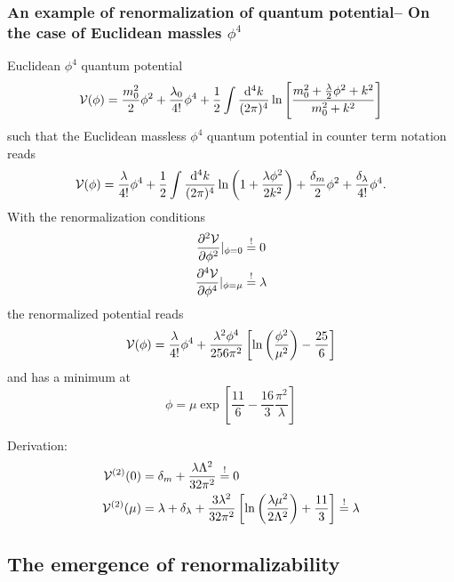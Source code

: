 \subsubsection{An example of renormalization of quantum potential-- On the case of Euclidean massles $\phi^4$}
\begin{mybox}{}
	Euclidean $\phi^4$ quantum potential
	\begin{equation}
		\mathcal{V}(\phi)=\frac{m^2_0}{2} \phi^2 +\frac{\lambda_0}{4!} \phi^4 + \frac{1}{2} \int \frac{\mathrm{d}^4 k}{(2 \pi)^4} \ln \left[\frac{m^2_0+\frac{\lambda}{2} \phi^2+k^2}{m^2_0+k^2}\right]
	\end{equation}
	such that the Euclidean massless $\phi^4$ quantum potential in counter term notation reads
	\begin{equation}
		\mathcal{V}(\phi) = \frac{\lambda}{4!}\phi^4 + \frac{1}{2} \int \frac{\mathrm{d}^4 k}{(2 \pi)^4} \ln \left(1+\frac{\lambda \phi^2}{2 k^2}\right) +\frac{\delta_m}{2} \phi^2+\frac{\delta_\lambda}{4!}\phi^4.
	\end{equation}
	With the renormalization conditions
	\begin{align}
		\frac{\partial^2 \mathcal{V}}{\partial \phi^2}|_{\phi=0} &\stackrel{!}{=} 0 \\
		\frac{\partial^4 \mathcal{V}}{\partial \phi^4} |_{\phi=\mu} &\stackrel{!}{=} \lambda
	\end{align}
the renormalized potential reads
\begin{equation}
	\mathcal{V}(\phi) = \frac{\lambda}{4!}\phi^4 + \frac{\lambda^2 \phi^4}{256 \pi^2}\left[\ln\left(\frac{\phi^2}{\mu^2}\right)-\frac{25}{6}\right]
\end{equation}
and has a minimum at
\begin{equation}
	\phi = \mu \exp\left[\frac{11}{6} - \frac{16}{3} \frac{\pi^2}{\lambda}\right]
\end{equation}
\end{mybox}
Derivation:
\begin{align*}
	\mathcal{V}^{(2)}(0) &= \delta_m + \frac{\lambda \Lambda^2}{32 \pi^2} \stackrel{!}{=} 0 \\
	\mathcal{V}^{(2)}(\mu) &= \lambda + \delta_{\lambda}+\frac{3\lambda^2}{32 \pi^2}\left[\ln \left(\frac{\lambda \mu^2}{2 \Lambda^2}\right)+\frac{11}{3}\right]\stackrel{!}{=}\lambda
\end{align*}



\subsection{The emergence of renormalizability}

